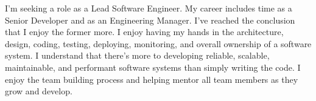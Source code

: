 

\begin{cvparagraph}
I'm seeking a role as a Lead Software Engineer.  My career includes
time as a Senior Developer and as an Engineering Manager. I've reached
the conclusion that I enjoy the former more.  I enjoy having my hands
in the architecture, design, coding, testing, deploying, monitoring,
and overall ownership of a software system.  I understand that there's
more to developing reliable, scalable, maintainable, and performant
software systems than simply writing the code.  I enjoy the team
building process and helping mentor all team members as they grow and
develop.
\end{cvparagraph}
